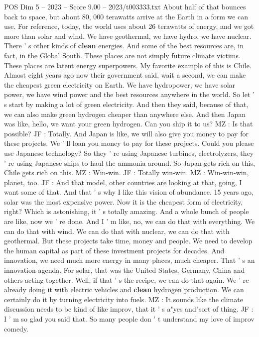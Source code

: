 \begin{textsample}{POS Dim 5 – 2023 – Score 9.00 – 2023/t003333.txt}
About half of that bounces back to space, but about 80, 000 terawatts arrive at the Earth in a form we can use.
For reference, today, the world uses about 26 terawatts of energy, and we got more than solar and wind.
We have geothermal, we have hydro, we have nuclear.
There ' s other kinds of \textbf{clean} energies.
And some of the best resources are, in fact, in the Global South.
These places are not simply future climate victims.
These places are latent energy superpowers.
My favorite example of this is Chile.
Almost eight years ago now their government said, wait a second, we can make the cheapest green electricity on Earth.
We have hydropower, we have solar power, we have wind power and the best resources anywhere in the world.
So let ' s start by making a lot of green electricity.
And then they said, because of that, we can also make green hydrogen cheaper than anywhere else.
And then Japan was like, hello, we want your green hydrogen.
Can you ship it to us?
MZ : Is that possible?
JF : Totally.
And Japan is like, we will also give you money to pay for these projects.
We ' ll loan you money to pay for these projects.
Could you please use Japanese technology?
So they ' re using Japanese turbines, electrolyzers, they ' re using Japanese ships to haul the ammonia around.
So Japan gets rich on this, Chile gets rich on this.
MZ : Win-win.
JF : Totally win-win.
MZ : Win-win-win, planet, too.
JF : And that model, other countries are looking at that, going, I want some of that.
And that ' s why I like this vision of abundance. 15 years ago, solar was the most expensive power.
Now it is the cheapest form of electricity, right?
Which is astonishing, it ' s totally amazing.
And a whole bunch of people are like, now we ' re done.
And I ' m like, no, we can do that with everything.
We can do that with wind.
We can do that with nuclear, we can do that with geothermal.
But these projects take time, money and people.
We need to develop the human capital as part of these investment projects for decades.
And innovation, we need much more energy in many places, much cheaper.
That ' s an innovation agenda.
For solar, that was the United States, Germany, China and others acting together.
Well, if that ' s the recipe, we can do that again.
We ' re already doing it with electric vehicles and \textbf{clean} hydrogen production.
We can certainly do it by turning electricity into fuels.
MZ : It sounds like the climate discussion needs to be kind of like improv, that it ' s a"yes and"sort of thing.
JF : I ' m so glad you said that.
So many people don ' t understand my love of improv comedy.

\end{textsample}

